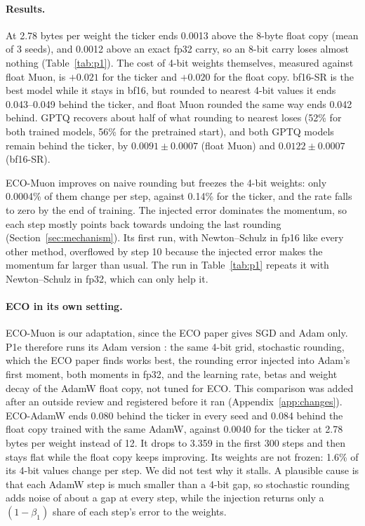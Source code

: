 \documentclass[11pt]{article}
\begin{document}
\paragraph{Results.} At 2.78 bytes per weight the ticker ends 0.0013 above the 8-byte float copy (mean of 3 seeds),
and 0.0012 above an exact fp32 carry, so an 8-bit carry loses almost nothing (Table~\ref{tab:p1}). The cost of 4-bit
weights themselves, measured against float Muon, is $+0.021$ for the ticker and $+0.020$ for the float copy. bf16-SR
is the best model while it stays in bf16, but rounded to nearest 4-bit values it ends 0.043--0.049 behind the ticker,
and float Muon rounded the same way ends 0.042 behind. GPTQ recovers about half of what rounding to nearest loses (52\%
for both trained models, 56\% for the pretrained start), and both GPTQ models remain behind the ticker, by
$0.0091 \pm 0.0007$ (float Muon) and $0.0122 \pm 0.0007$ (bf16-SR).

ECO-Muon improves on naive rounding but freezes the 4-bit weights: only 0.0004\% of them change per step, against
0.14\% for the ticker, and the rate falls to zero by the end of training. The injected error dominates the momentum, so
each step mostly points back towards undoing the last rounding (Section~\ref{sec:mechanism}). Its first run, with
Newton--Schulz in fp16 like every other method, overflowed by step 10 because the injected error makes the momentum
far larger than usual. The run in Table~\ref{tab:p1} repeats it with Newton--Schulz in fp32, which can only help it.

\paragraph{ECO in its own setting.} ECO-Muon is our adaptation, since the ECO paper gives SGD and Adam only. P1e
therefore runs its Adam version \citep[Algorithm 3]{nikdan2026eco}: the same 4-bit grid, stochastic rounding, which
the ECO paper finds works best, the rounding error injected into Adam's first moment, both moments in fp32, and the
learning rate, betas and weight decay of the AdamW float copy, not tuned for ECO. This comparison was added after an
outside review and registered before it ran (Appendix~\ref{app:changes}). ECO-AdamW ends 0.080 behind the ticker in
every seed and 0.084 behind the float copy trained with the same AdamW, against 0.0040 for the ticker at 2.78 bytes per
weight instead of 12. It drops to 3.359 in the first 300 steps and then stays flat while the float copy keeps
improving. Its weights are not frozen: 1.6\% of its 4-bit values change per step. We did not test why it stalls. A
plausible cause is that each AdamW step is much smaller than a 4-bit gap, so stochastic rounding adds noise of about a
gap at every step, while the injection returns only a $(1-\beta_1)$ share of each step's error to the weights.
\end{document}
